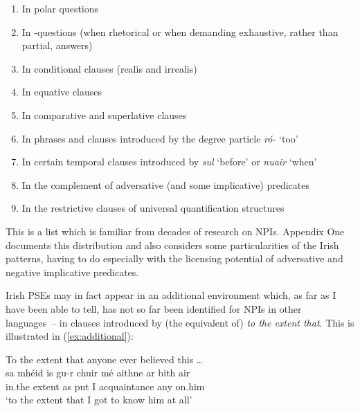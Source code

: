 \documentclass[output=paper,colorlinks,citecolor=brown]{langscibook}
\begin{document}
\begin{enumerate}
\item In  polar questions 
\item In \WH-questions (when rhetorical or when demanding exhaustive, rather than partial, answers) 
\item In conditional clauses (realis and irrealis)
\item In equative clauses
\item In comparative and superlative clauses  
\item In phrases and clauses introduced by the degree particle \textit{ró-} `too'
\item In certain temporal clauses introduced by {\itshape sul} `before' or {\itshape nuair} `when'
\item In the complement of adversative (and some implicative) predicates 
\item In the restrictive clauses of universal quantification structures
\end{enumerate}


This is a list which is familiar from decades of research on NPIs. Appendix One documents this distribution and also considers some particularities of the Irish patterns, having to do especially with the licensing potential of adversative and negative implicative predicates. 

Irish PSEs may in fact appear in an additional environment which, as far as I have been able to tell, has not so far been identified for NPIs in other languages~-- in clauses introduced by (the equivalent of) {\itshape to the extent that}. This is illustrated in (\ref{ex:additional}):

\ea\label{ex:additional}
      To the extent that anyone ever believed this \ldots \\ 
\gll  sa mhéid is gu-r chuir mé aithne {ar bith} air \\
     in.the extent as {\gur} {put\past} I acquaintance any on.him \\
\glt `to the extent that I got to know him at all'
\z
\end{document}
